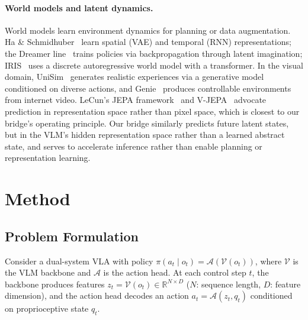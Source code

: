 \documentclass{article}
\begin{document}
\paragraph{World models and latent dynamics.}
World models learn environment dynamics for planning or data augmentation.
Ha \& Schmidhuber~\cite{ha2018world} learn spatial (VAE) and temporal (RNN) representations; the Dreamer line~\cite{hafner2020dreamer, hafner2023dreamerv3} trains policies via backpropagation through latent imagination; IRIS~\cite{micheli2023iris} uses a discrete autoregressive world model with a transformer.
In the visual domain, UniSim~\cite{yang2024unisim} generates realistic experiences via a generative model conditioned on diverse actions, and Genie~\cite{bruce2024genie} produces controllable environments from internet video.
LeCun's JEPA framework~\cite{lecun2022jepa} and V-JEPA~\cite{bardes2024vjepa} advocate prediction in representation space rather than pixel space, which is closest to our bridge's operating principle.
Our bridge similarly predicts future latent states, but in the VLM's hidden representation space rather than a learned abstract state, and serves to accelerate inference rather than enable planning or representation learning.

\section{Method}

\subsection{Problem Formulation}

Consider a dual-system VLA with policy $\pi(a_t \mid o_t) = \mathcal{A}(\mathcal{V}(o_t))$, where $\mathcal{V}$ is the VLM backbone and $\mathcal{A}$ is the action head.
At each control step $t$, the backbone produces features $z_t = \mathcal{V}(o_t) \in \mathbb{R}^{N \times D}$ ($N$: sequence length, $D$: feature dimension), and the action head decodes an action $a_t = \mathcal{A}(z_t, q_t)$ conditioned on proprioceptive state $q_t$.
\end{document}
